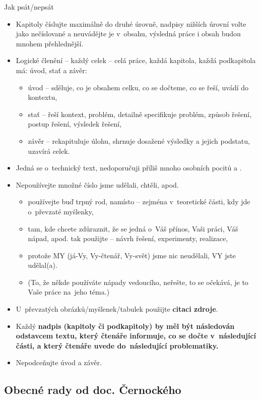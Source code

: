 Jak psát/nepsát
\begin{itemize}
  \item{Kapitoly číslujte maximálně do druhé úrovně, nadpisy nižších úrovní volte jako nečíslované a neuvádějte je v~obsahu, výsledná práce i obsah budou mnohem přehlednější.}
  \item{Logické členění -- každý celek -- celá práce, každá kapitola, každá podkapitola má: úvod, stať a závěr:
    \begin{itemize}
      \item{úvod -- sděluje, co je obsahem celku, co se dočteme, co se řeší, uvádí do kontextu,}
      \item{stať -- řeší kontext, problém, detailně specifikuje problém, způsob řešení, postup řešení, výsledek řešení,}
      \item{závěr -- rekapituluje úlohu, shrnuje dosažené výsledky a jejich podstatu, uzavírá celek.}
    \end{itemize}}
  \item{Jedná se o~technický text, nedoporučuji příliš mnoho osobních pocitů a .}
  \item{Nepoužívejte množné číslo  jsme udělali, chtěli, apod.
    \begin{itemize}
      \item{používejte buď trpný rod,  namísto  -- zejména v~teoretické části, kdy jde o~převzaté myšlenky,}
      \item{tam, kde chcete zdůraznit, že se jedná o~Váš přínos, Vaši práci, Váš nápad, apod. tak použijte  -- návrh řešení, experimenty, realizace,}
      \item{protože MY (já-Vy, Vy-čtenář, Vy-svět) jsme nic neudělali, VY jste udělal(a).}
      \item{(To, že někde používáte nápady vedoucího, neřešte, to se očekává, je to Vaše práce na~jeho téma.)}
    \end{itemize}}
  \item{U~převzatých obrázků/myšlenek/tabulek použijte \bf citaci zdroje\rm }.
  \item{Každý \bf nadpis \rm (kapitoly či podkapitoly) by měl být následován odstavcem textu, který čtenáře informuje, co se dočte v~následující části, a který čtenáře uvede do~následující problematiky.}
  \item{Nepodceňujte úvod a závěr.}
\end{itemize}


\subsection*{Obecné rady od doc. Černockého}

